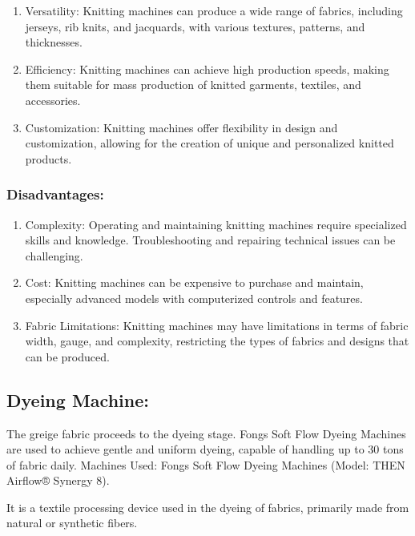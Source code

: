 \begin{enumerate}
\item
  Versatility: Knitting machines can produce a wide range of fabrics,
  including jerseys, rib knits, and jacquards, with various textures,
  patterns, and thicknesses.
\item
  Efficiency: Knitting machines can achieve high production speeds,
  making them suitable for mass production of knitted garments,
  textiles, and accessories.
\item
  Customization: Knitting machines offer flexibility in design and
  customization, allowing for the creation of unique and personalized
  knitted products.
\end{enumerate}

\subsubsection{Disadvantages:}

\begin{enumerate}
\item
  Complexity: Operating and maintaining knitting machines require
  specialized skills and knowledge. Troubleshooting and repairing
  technical issues can be challenging.
\item
  Cost: Knitting machines can be expensive to purchase and maintain,
  especially advanced models with computerized controls and features.
\item
  Fabric Limitations: Knitting machines may have limitations in terms of
  fabric width, gauge, and complexity, restricting the types of fabrics
  and designs that can be produced.
\end{enumerate}

\subsection{Dyeing Machine:\cite{dyeing_machines}}

The greige fabric proceeds to the dyeing stage. 
Fongs Soft Flow Dyeing Machines are used to achieve gentle and uniform dyeing, 
capable of handling up to 30 tons of fabric daily.
Machines Used: Fongs Soft Flow Dyeing Machines (Model: THEN Airflow® Synergy 8).

It is a textile processing device used in the
dyeing of fabrics, primarily made from natural or synthetic fibers.

